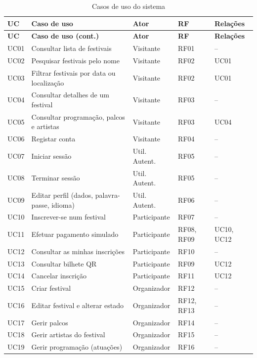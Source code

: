 \begin{longtable}{|l|p{5.6cm}|l|l|p{2.6cm}|}
\caption{Casos de uso do sistema}\label{tab:uc}\\
\hline
\textbf{UC} & \textbf{Caso de uso} & \textbf{Ator} & \textbf{RF} & \textbf{Relações} \\ \hline
\endfirsthead
\hline
\textbf{UC} & \textbf{Caso de uso (cont.)} & \textbf{Ator} & \textbf{RF} & \textbf{Relações} \\ \hline
\endhead
UC01 & Consultar lista de festivais & Visitante & RF01 & -- \\ \hline
UC02 & Pesquisar festivais pelo nome & Visitante & RF02 & \extd{} UC01 \\ \hline
UC03 & Filtrar festivais por data ou localização & Visitante & RF02 & \extd{} UC01 \\ \hline
UC04 & Consultar detalhes de um festival & Visitante & RF03 & -- \\ \hline
UC05 & Consultar programação, palcos e artistas & Visitante & RF03 & \extd{} UC04 \\ \hline
UC06 & Registar conta & Visitante & RF04 & -- \\ \hline
UC07 & Iniciar sessão & Util. Autent. & RF05 & -- \\ \hline
UC08 & Terminar sessão & Util. Autent. & RF05 & -- \\ \hline
UC09 & Editar perfil (dados, palavra-passe, idioma) & Util. Autent. & RF06 & -- \\ \hline
UC10 & Inscrever-se num festival & Participante & RF07 & -- \\ \hline
UC11 & Efetuar pagamento simulado & Participante & RF08, RF09 & \extd{} UC10, UC12 \\ \hline
UC12 & Consultar as minhas inscrições & Participante & RF10 & -- \\ \hline
UC13 & Consultar bilhete QR & Participante & RF09 & \extd{} UC12 \\ \hline
UC14 & Cancelar inscrição & Participante & RF11 & \extd{} UC12 \\ \hline
UC15 & Criar festival & Organizador & RF12 & -- \\ \hline
UC16 & Editar festival e alterar estado & Organizador & RF12, RF13 & -- \\ \hline
UC17 & Gerir palcos & Organizador & RF14 & -- \\ \hline
UC18 & Gerir artistas do festival & Organizador & RF15 & -- \\ \hline
UC19 & Gerir programação (atuações) & Organizador & RF16 & -- \\ \hline

\end{longtable}
